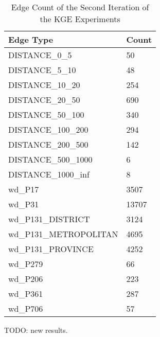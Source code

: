 \begin{table}[!ht]
    \centering
    \begin{tabular}{|l|l|}
        \hline
        \textbf{Edge Type } & \textbf{Count} \\ \hline
        DISTANCE\_0\_5 & 50 \\ \hline
        DISTANCE\_5\_10 & 48 \\ \hline
        DISTANCE\_10\_20 & 254 \\ \hline
        DISTANCE\_20\_50 & 690 \\ \hline
        DISTANCE\_50\_100 & 340 \\ \hline
        DISTANCE\_100\_200 & 294 \\ \hline
        DISTANCE\_200\_500 & 142 \\ \hline
        DISTANCE\_500\_1000 & 6 \\ \hline
        DISTANCE\_1000\_inf & 8 \\ \hline
        wd\_P17 & 3507 \\ \hline
        wd\_P31 & 13707 \\ \hline
        wd\_P131\_DISTRICT & 3124 \\ \hline
        wd\_P131\_METROPOLITAN & 4695 \\ \hline
        wd\_P131\_PROVINCE & 4252 \\ \hline
        wd\_P279 & 66 \\ \hline
        wd\_P206 & 223 \\ \hline
        wd\_P361 & 287 \\ \hline
        wd\_P706 & 57 \\ \hline
    \end{tabular}
    \caption{Edge Count of the Second Iteration of the KGE Experiments}
    \label{tab:kge-new-edges}
\end{table}

TODO: new results.
